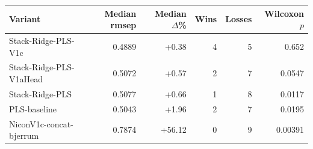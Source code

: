 \begin{tabular}{lrrrrr}
\toprule
Variant & Median rmsep & Median $\Delta$\% & Wins & Losses & Wilcoxon $p$ \\ 
\midrule
Stack-Ridge-PLS-V1c & 0.4889 & +0.38 & 4 & 5 & 0.652 \\ 
Stack-Ridge-PLS-V1aHead & 0.5072 & +0.57 & 2 & 7 & 0.0547 \\ 
Stack-Ridge-PLS & 0.5077 & +0.66 & 1 & 8 & 0.0117 \\ 
PLS-baseline & 0.5043 & +1.96 & 2 & 7 & 0.0195 \\ 
NiconV1c-concat-bjerrum & 0.7874 & +56.12 & 0 & 9 & 0.00391 \\ 
\bottomrule
\end{tabular}
